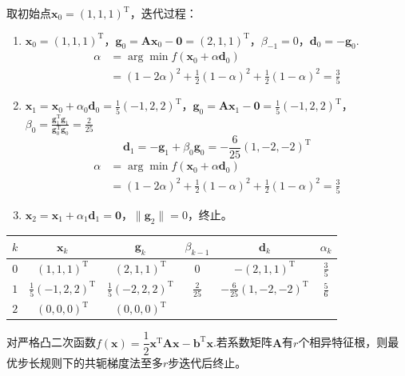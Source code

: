 \begin{example}
    
    取初始点$\boldsymbol{x}_0 = (1,1,1)^{\mathrm{T}} $，迭代过程：
    \begin{enumerate}
        \item $\boldsymbol{x}_0 = (1,1,1)^{\mathrm{T}} $，$\boldsymbol{g}_0 = \boldsymbol{Ax}_0-\boldsymbol{0} = (2,1,1)^{\mathrm{T}}$，$\beta_{-1} = 0$，$\boldsymbol{d}_{0} = -\boldsymbol{g}_0$.
        \[
            \begin{array}{ll}
                \alpha &= \arg\min f(\boldsymbol{x}_0+\alpha \boldsymbol{d}_0)\\
                & = (1-2\alpha)^2+\frac{1}{2}(1-\alpha)^2+\frac{1}{2}(1-\alpha)^2 = \frac{3}{5}
            \end{array}
        \]
        \item $\boldsymbol{x}_1 = \boldsymbol{x}_0+\alpha_0\boldsymbol{d}_0=\frac{1}{5}(-1,2,2)^{\mathrm{T}} $，$\boldsymbol{g}_0 = \boldsymbol{Ax}_1-\boldsymbol{0} = \frac{1}{5}(-1,2,2)^{\mathrm{T}}$，$\beta_{0} = \frac{\boldsymbol{g}_1^{\mathrm{T}}\boldsymbol{g}_1}{\boldsymbol{g}_0^{\mathrm{T}}\boldsymbol{g}_0}= \frac{2}{25}$ 
        \[
            \boldsymbol{d}_{1} = -\boldsymbol{g}_1+\beta_{0}\boldsymbol{g}_0 = -\frac{6}{25}(1,-2,-2)^{\mathrm{T}}
        \]
        \[
            \begin{array}{ll}
                \alpha &= \arg\min f(\boldsymbol{x}_0+\alpha \boldsymbol{d}_0)\\
                & = (1-2\alpha)^2+\frac{1}{2}(1-\alpha)^2+\frac{1}{2}(1-\alpha)^2 = \frac{3}{5}
            \end{array}
        \]
        \item $\boldsymbol{x}_2 = \boldsymbol{x}_1 + \alpha_1\boldsymbol{d}_1 = \boldsymbol{0}$，$\|\boldsymbol{g}_2\| = 0$，终止。
    \end{enumerate}

    \begin{table}[htbp]
        \centering
        \begin{tabular}{c|c|c|c|c|c}
            \hline
            $k$ & $\boldsymbol{x}_k$ & $\boldsymbol{g}_k$ & $\beta_{k-1}$ & $\boldsymbol{d}_k$ & $\alpha_k$\\\hline
            $0$ & $ (1,1,1)^{\mathrm{T}} $ & $(2,1,1)^{\mathrm{T}}$ & $0$ & $ -(2,1,1)^{\mathrm{T}} $ & $\frac{3}{5}$\\\hline
            $1$ & $ \frac{1}{5}(-1,2,2)^{\mathrm{T}} $ & $\frac{1}{5}(-2,2,2)^{\mathrm{T}}$ & $\frac{2}{25}$ & $ -\frac{6}{25}(1,-2,-2)^{\mathrm{T}} $ & $\frac{5}{6}$\\\hline
            $2$ & $(0,0,0)^{\mathrm{T}}$ & $(0,0,0)^{\mathrm{T}}$ & \\\hline
        \end{tabular}
    \end{table}
\end{example}
\begin{theorem}[收敛速度]
    对严格凸二次函数$f(\boldsymbol{x}) = \dfrac{1}{2}\boldsymbol{x}^{\mathrm{T}}\boldsymbol{Ax}-\boldsymbol{b}^{\mathrm{T}}\boldsymbol{x}$.若系数矩阵$\boldsymbol{A}$有$r$个相异特征根，则最优步长规则下的共轭梯度法至多$r$步迭代后终止。
\end{theorem}

